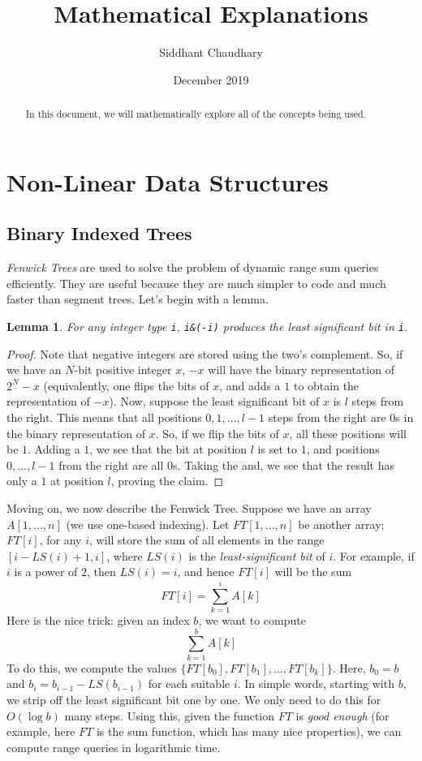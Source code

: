 \documentclass[12pt,a4paper]{amsart}
\numberwithin{equation}{section}
\newtheorem{Lemma}[Th]{Lemma}
\theoremstyle{definition}
\begin{document}
\title{Mathematical Explanations}
\author{Siddhant Chaudhary}
\date{December 2019}

\maketitle
    
\begin{abstract}
In this document, we will mathematically explore all of the concepts being used. 
\end{abstract}
    
\tableofcontents

\section{Non-Linear Data Structures}
\subsection{Binary Indexed Trees} \textit{Fenwick Trees} are used to solve the problem of dynamic range sum queries efficiently. They are useful because they are much simpler to code and much faster than segment trees. Let's begin with a lemma.

\begin{Lemma}
    For any integer type \verb|i|, \verb|i&(-i)| produces the least significant bit in \verb|i|.
\end{Lemma}
\begin{proof}
    Note that negative integers are stored using the two's complement. So, if we have an $N$-bit positive integer $x$, $-x$ will have the binary representation of $2^N - x$ (equivalently, one flips the bits of $x$, and adds a $1$ to obtain the representation of $-x$). Now, suppose the least significant bit of $x$ is $l$ steps from the right. This means that all positions $0,1,...,l - 1$ steps from the right are $0$s in the binary representation of $x$. So, if we flip the bits of $x$, all these positions will be $1$. Adding a $1$, we see that the bit at position $l$ is set to $1$, and positions $0,...,l - 1$ from the right are all $0$s. Taking the and, we see that the result has only a $1$ at position $l$, proving the claim. 
\end{proof}

Moving on, we now describe the Fenwick Tree. Suppose we have an array $A[1,...,n]$ (we use one-based indexing). Let $FT[1,...,n]$ be another array; $FT[i]$, for any $i$, will store the sum of all elements in the range $[i - LS(i) + 1, i]$, where $LS(i)$ is the \textit{least-significant bit} of $i$. For example, if $i$ is a power of $2$, then $LS(i) = i$, and hence $FT[i]$ will be the sum 
$$FT[i] = \sum_{k = 1}^i A[k]$$
Here is the nice trick: given an index $b$, we want to compute 
$$\sum_{k = 1}^b A[k]$$
To do this, we compute the values $\{FT[b_0], FT[b_1],...,FT[b_k]\}$. Here, $b_0 = b$ and $b_i = b_{i - 1} - LS(b_{i - 1})$ for each suitable $i$. In simple words, starting with $b$, we strip off the least significant bit one by one. We only need to do this for $O(\log b)$ many steps. Using this, given the function $FT$ is \textit{good enough} (for example, here $FT$ is the sum function, which has many nice properties), we can compute range queries in logarithmic time. 
\end{document}
